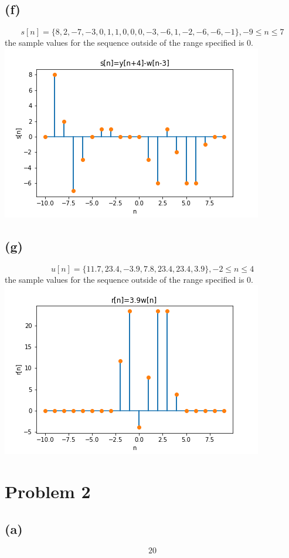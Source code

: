 \subsection*{(f)}
$$\boxed{s[n]=\{8, 2, -7, -3, 0, 1, 1, 0, 0, 0, -3, -6, 1, -2, -6, -6, -1\}, 
-9\leq n \leq7}$$ 
the sample values for the sequence outside of the range specified
is 0.\\
\includegraphics[scale=0.5]{s.png}
\subsection*{(g)}
$$\boxed{u[n]=\{11.7, 23.4, -3.9, 7.8, 23.4, 23.4, 3.9\}, 
-2\leq n \leq4}$$ 
the sample values for the sequence outside of the range specified
is 0.\\
\includegraphics[scale=0.5]{r.png}
\section*{Problem 2}
\subsection*{(a)}
$$\boxed{20}$$
